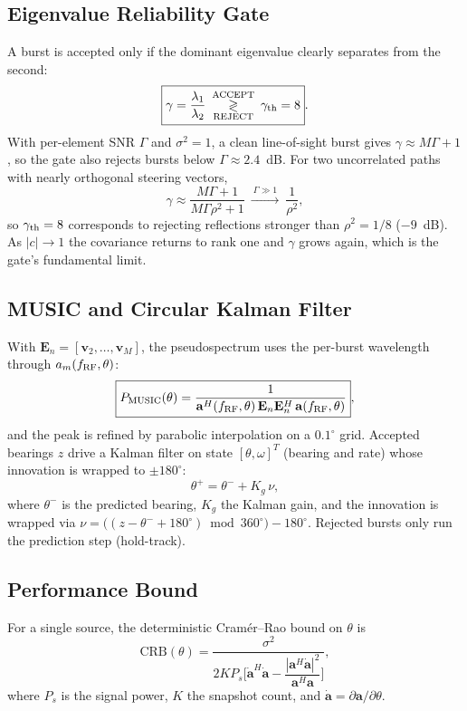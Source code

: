 \documentclass[conference]{IEEEtran}
\newcommand{\vect}[1]{\mathbf{#1}}
\begin{document}
\subsection{Eigenvalue Reliability Gate}
A burst is accepted only if the dominant eigenvalue clearly separates from the second:
\begin{equation}
\boxed{\gamma=\frac{\lambda_1}{\lambda_2}\ \mathop{\gtrless}_{\text{REJECT}}^{\text{ACCEPT}}\ \gamma_{\rm th}=8}.
\label{eq:gate}
\end{equation}
With per-element SNR $\Gamma$ and $\sigma^2=1$, a clean line-of-sight burst gives $\gamma\approx M\Gamma+1$, so the gate also rejects bursts below $\Gamma\approx 2.4$~dB. For two uncorrelated paths with nearly orthogonal steering vectors,
\begin{equation}
\gamma\approx\frac{M\Gamma+1}{M\Gamma\rho^{2}+1}\ \xrightarrow{\ \Gamma\gg1\ }\ \frac{1}{\rho^{2}},
\label{eq:gamma}
\end{equation}
so $\gamma_{\rm th}=8$ corresponds to rejecting reflections stronger than $\rho^2=1/8$ ($-9$~dB). As $|c|\to1$ the covariance returns to rank one and $\gamma$ grows again, which is the gate's fundamental limit.

\subsection{MUSIC and Circular Kalman Filter}
With $\vect{E}_n=[\vect{v}_2,\dots,\vect{v}_M]$, the pseudospectrum uses the per-burst wavelength through $a_m(f_{\rm RF},\theta)$:
\begin{equation}
\boxed{P_{\rm MUSIC}(\theta)=\frac{1}{\vect{a}^{H}(f_{\rm RF},\theta)\,\vect{E}_n\vect{E}_n^{H}\,\vect{a}(f_{\rm RF},\theta)}},
\label{eq:music}
\end{equation}
and the peak is refined by parabolic interpolation on a $0.1^\circ$ grid. Accepted bearings $z$ drive a Kalman filter on state $[\theta,\omega]^T$ (bearing and rate) whose innovation is wrapped to $\pm180^\circ$:
\begin{equation}
\boxed{\theta^{+}=\theta^{-}+K_g\,\nu},
\label{eq:kf}
\end{equation}
where $\theta^-$ is the predicted bearing, $K_g$ the Kalman gain, and the innovation is wrapped via $\nu=\big((z-\theta^{-}+180^\circ)\bmod 360^\circ\big)-180^\circ$. Rejected bursts only run the prediction step (hold-track).

\subsection{Performance Bound}
For a single source, the deterministic Cram\'er--Rao bound on $\theta$ is \cite{stoica}
\begin{equation}
\boxed{\mathrm{CRB}(\theta)=\frac{\sigma^2}{2KP_s\Big[\dot{\vect a}^{H}\dot{\vect a}-\dfrac{|\vect a^{H}\dot{\vect a}|^2}{\vect a^{H}\vect a}\Big]}},
\label{eq:crb}
\end{equation}
where $P_s$ is the signal power, $K$ the snapshot count, and $\dot{\vect a}=\partial\vect a/\partial\theta$.
\end{document}
